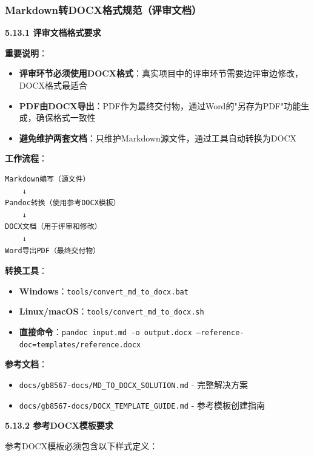 \documentclass[12pt,a4paper]{article}
\numberwithin{equation}{section}  %
\begin{document}
\subsubsection{Markdown转DOCX格式规范（评审文档）}
\textbf{5.13.1 评审文档格式要求}

\textbf{重要说明}：
\begin{itemize}
\item [警告] \textbf{评审环节必须使用DOCX格式}：真实项目中的评审环节需要边评审边修改，DOCX格式最适合
\item [警告] \textbf{PDF由DOCX导出}：PDF作为最终交付物，通过Word的"另存为PDF"功能生成，确保格式一致性
\item [警告] \textbf{避免维护两套文档}：只维护Markdown源文件，通过工具自动转换为DOCX
\end{itemize}

\textbf{工作流程}：
\begin{verbatim}
Markdown编写（源文件）
    ↓
Pandoc转换（使用参考DOCX模板）
    ↓
DOCX文档（用于评审和修改）
    ↓
Word导出PDF（最终交付物）
\end{verbatim}

\textbf{转换工具}：
\begin{itemize}
\item \textbf{Windows}：\texttt{tools/convert\_md\_to\_docx.bat}
\item \textbf{Linux/macOS}：\texttt{tools/convert\_md\_to\_docx.sh}
\item \textbf{直接命令}：\texttt{pandoc input.md -o output.docx --reference-doc=templates/reference.docx}
\end{itemize}

\textbf{参考文档}：
\begin{itemize}
\item \texttt{docs/gb8567-docs/MD\_TO\_DOCX\_SOLUTION.md} - 完整解决方案
\item \texttt{docs/gb8567-docs/DOCX\_TEMPLATE\_GUIDE.md} - 参考模板创建指南
\end{itemize}

\textbf{5.13.2 参考DOCX模板要求}

参考DOCX模板必须包含以下样式定义：
\end{document}
